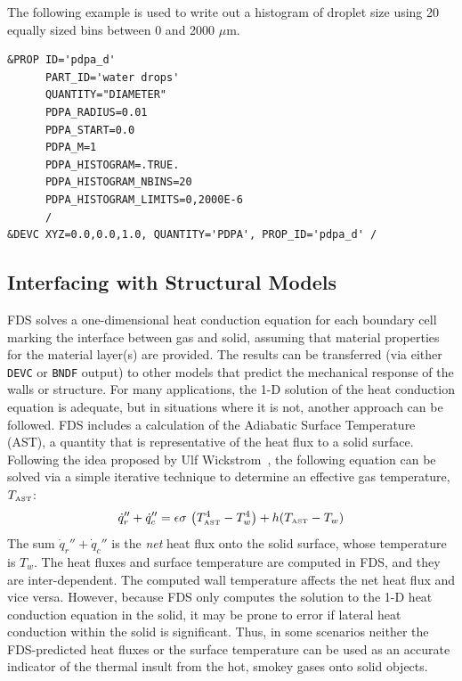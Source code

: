 \documentclass[11pt]{book}
\newcommand{\ct}{\tt\small}
\newcommand{\be}{\begin{equation}}
\newcommand{\ee}{\end{equation}}
\begin{document}
\noindent The following example is used to write out a histogram of droplet size using 20 equally sized bins between 0 and 2000 $\mu$m.
\footnotesize
\begin{verbatim}
&PROP ID='pdpa_d'
      PART_ID='water drops'
      QUANTITY="DIAMETER"
      PDPA_RADIUS=0.01
      PDPA_START=0.0
      PDPA_M=1
      PDPA_HISTOGRAM=.TRUE.
      PDPA_HISTOGRAM_NBINS=20
      PDPA_HISTOGRAM_LIMITS=0,2000E-6
      /
&DEVC XYZ=0.0,0.0,1.0, QUANTITY='PDPA', PROP_ID='pdpa_d' /
\end{verbatim}

\normalsize



\subsection{Interfacing with Structural Models}
\label{info:AST}

FDS solves a one-dimensional heat conduction equation for each
boundary cell marking the interface between gas and solid, assuming
that material properties for the material layer(s) are provided. The
results can be transferred (via either {\ct DEVC} or {\ct BNDF}
output) to other models that predict the mechanical response of the
walls or structure. For many applications, the 1-D solution of the
heat conduction equation is adequate, but in situations where it is
not, another approach can be followed. FDS includes a calculation of
the Adiabatic Surface Temperature (AST), a quantity that is
representative of the heat flux to a solid surface. Following the idea
proposed by Ulf Wickstrom~\cite{Wickstrom:Interflam2007}, the
following equation can be solved via a simple iterative technique to
determine an effective gas temperature, $T_{\hbox{\tiny AST}}$:
\be \dot{q}_r'' + \dot{q}_c'' = \epsilon \sigma \, \left(
T_{\hbox{\tiny AST}}^4 - T_w^4 \right) + h (T_{\hbox{\tiny AST}} - T_w)  \ee
The sum $\dot{q}_r'' + \dot{q}_c''$ is the {\em net} heat flux onto
the solid surface, whose temperature is $T_w$. The heat fluxes and
surface temperature are computed in FDS, and they are
inter-dependent. The computed wall temperature affects the net heat
flux and vice versa. However, because FDS only computes the solution
to the 1-D heat conduction equation in the solid, it may be prone to
error if lateral heat conduction within the solid is
significant. Thus, in some scenarios neither the FDS-predicted heat
fluxes or the surface temperature can be used as an accurate indicator
of the thermal insult from the hot, smokey gases onto solid objects.
\end{document}
